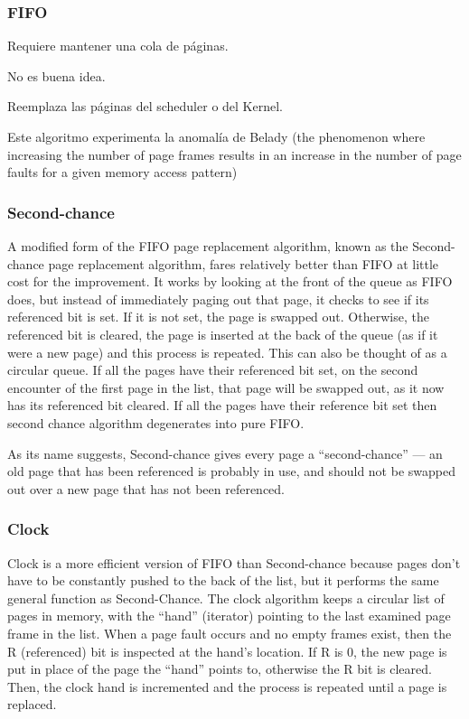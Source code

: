 \documentclass[a4paper, twoside]{article}
\begin{document}
\subsubsection{FIFO}

Requiere mantener una cola de páginas.

No es buena idea.

Reemplaza las páginas del scheduler o del Kernel.

Este algoritmo experimenta la anomalía de Belady (the phenomenon where
increasing the number of page frames results in an increase in the number of
page faults for a given memory access pattern)

\subsubsection{Second-chance}

A modified form of the FIFO page replacement algorithm, known as the
Second-chance page replacement algorithm, fares relatively better than FIFO at
little cost for the improvement.
It works by looking at the front of the queue as FIFO does, but instead of
immediately paging out that page, it checks to see if its referenced bit is
set. If it is not set, the page is swapped out.
Otherwise, the referenced bit is cleared, the page is inserted at the back of
the queue (as if it were a new page) and this process is repeated.
This can also be thought of as a circular queue.
If all the pages have their referenced bit set, on the second encounter of the
first page in the list, that page will be swapped out, as it now has its
referenced bit cleared.
If all the pages have their reference bit set then second chance algorithm
degenerates into pure FIFO.

As its name suggests, Second-chance gives every page a ``second-chance'' ---
an old page that has been referenced is probably in use, and should not be
swapped out over a new page that has not been referenced.

\subsubsection{Clock}

Clock is a more efficient version of FIFO than Second-chance because pages don't have to be constantly pushed to the back of the list, but it performs the same general function as Second-Chance. The clock algorithm keeps a circular list of pages in memory, with the ``hand'' (iterator) pointing to the last examined page frame in the list. When a page fault occurs and no empty frames exist, then the R (referenced) bit is inspected at the hand's location. If R is 0, the new page is put in place of the page the ``hand'' points to, otherwise the R bit is cleared. Then, the clock hand is incremented and the process is repeated until a page is replaced.
\end{document}

